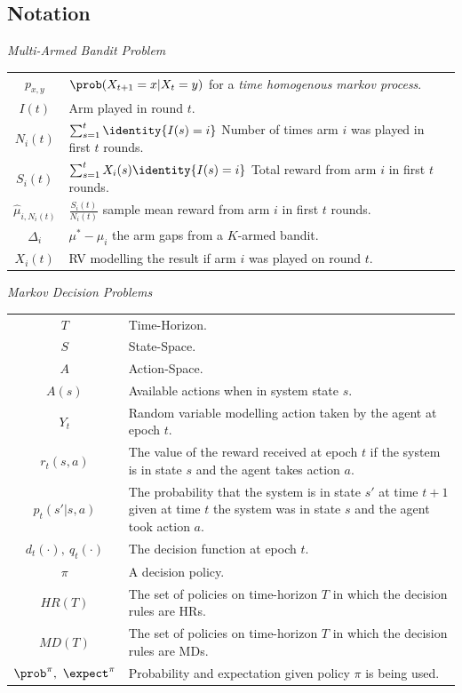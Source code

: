 \documentclass[11pt,a4paper]{article}
\begin{document}
\subsection{Notation}
  \textit{Multi-Armed Bandit Problem}\\
  \begin{tabular}{|c|l|}
    \hline
    $p_{x,y}$&$\prob(X_{t+1}=x|X_{t}=y)$ for a \textit{time homogenous markov process}.\\
    $I(t)$&Arm played in round $t$.\\
    $N_i(t)$&$\sum_{s=1}^t\identity\{I(s)=i\}$ Number of times arm $i$ was played in first $t$ rounds.\\
    $S_i(t)$&$\sum_{s=1}^tX_i(s)\identity\{I(s)=i\}$ Total reward from arm $i$ in first $t$ rounds.\\
    $\hat\mu_{i,N_i(t)}$&$\frac{S_i(t)}{N_i(t)}$ sample mean reward from arm $i$ in first $t$ rounds.\\
    $\Delta_i$&$\mu^*-\mu_i$ the arm gaps from a $K$-armed bandit.\\
    $X_i(t)$&RV modelling the result if arm $i$ was played on round $t$.\\
    \hline
  \end{tabular}

  \textit{Markov Decision Problems}\\
  \begin{tabular}{|c|l|}
    \hline
    $T$&Time-Horizon.\\
    $S$&State-Space.\\
    $A$&Action-Space.\\
    $A(s)$&Available actions when in system state $s$.\\
    $Y_t$&Random variable modelling action taken by the agent at epoch $t$.\\
    $r_t(s,a)$&The value of the reward received at epoch $t$ if the system is in state $s$ and the agent takes action $a$.\\
    $p_t(s'|s,a)$&The probability that the system is in state $s'$ at time $t+1$ given at time $t$ the system was in state $s$ and the agent took action $a$.\\
    $d_t(\cdot),\ q_t(\cdot)$&The decision function at epoch $t$.\\
    $\pi$&A decision policy.\\
    $HR(T)$&The set of policies on time-horizon $T$ in which the decision rules are HRs.\\
    $MD(T)$&The set of policies on time-horizon $T$ in which the decision rules are MDs.\\
    $\prob^\pi,\ \expect^\pi$&Probability and expectation given policy $\pi$ is being used.\\
    \hline
  \end{tabular}
\end{document}
